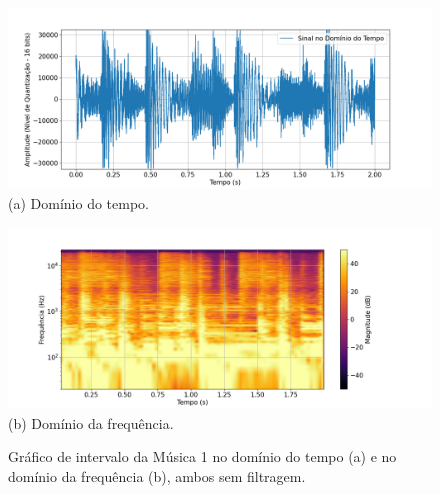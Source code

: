 \begin{figure}[htpb]
    \centering
    \begin{minipage}[b]{0.7\textwidth}
        \centering
        \includegraphics[width=\textwidth]{figuras/fig40.png}
        \vspace{0.3cm} %
        (a) Domínio do tempo.
    \end{minipage}
    \hspace{0.5cm} %

    \begin{minipage}[b]{0.7\textwidth}
        \centering
        \includegraphics[width=\textwidth]{figuras/fig41.png}
        \vspace{0.3cm} %
        (b) Domínio da frequência.
    \end{minipage}

    \caption{Gráfico de intervalo da Música 1 no domínio do tempo (a) e no domínio da frequência (b), ambos sem filtragem.}
    \label{fig40}
\end{figure}







